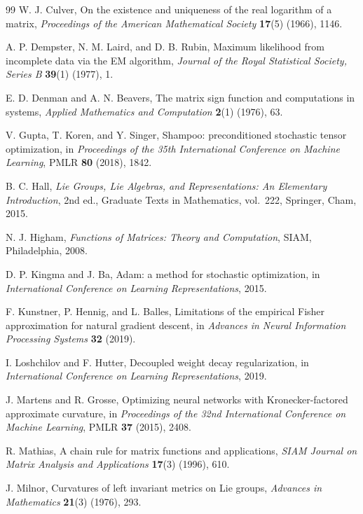\documentclass[11pt]{article}
\theoremstyle{definition}
\theoremstyle{remark}
\newcommand{\ndash}{\textendash}
\begin{document}
\begin{thebibliography}{99}
W. J. Culver, On the existence and uniqueness of the real logarithm of a matrix, \emph{Proceedings of the American Mathematical Society} \textbf{17}(5) (1966), 1146\ndash 1151.

A. P. Dempster, N. M. Laird, and D. B. Rubin, Maximum likelihood from incomplete data via the EM algorithm, \emph{Journal of the Royal Statistical Society, Series B} \textbf{39}(1) (1977), 1\ndash 38.

E. D. Denman and A. N. Beavers, The matrix sign function and computations in systems, \emph{Applied Mathematics and Computation} \textbf{2}(1) (1976), 63\ndash 94.

V. Gupta, T. Koren, and Y. Singer, Shampoo: preconditioned stochastic tensor optimization, in \emph{Proceedings of the 35th International Conference on Machine Learning}, PMLR \textbf{80} (2018), 1842\ndash 1850.

B. C. Hall, \emph{Lie Groups, Lie Algebras, and Representations: An Elementary Introduction}, 2nd ed., Graduate Texts in Mathematics, vol.~222, Springer, Cham, 2015.

N. J. Higham, \emph{Functions of Matrices: Theory and Computation}, SIAM, Philadelphia, 2008.

D. P. Kingma and J. Ba, Adam: a method for stochastic optimization, in \emph{International Conference on Learning Representations}, 2015.

F. Kunstner, P. Hennig, and L. Balles, Limitations of the empirical Fisher approximation for natural gradient descent, in \emph{Advances in Neural Information Processing Systems} \textbf{32} (2019).

I. Loshchilov and F. Hutter, Decoupled weight decay regularization, in \emph{International Conference on Learning Representations}, 2019.

J. Martens and R. Grosse, Optimizing neural networks with Kronecker-factored approximate curvature, in \emph{Proceedings of the 32nd International Conference on Machine Learning}, PMLR \textbf{37} (2015), 2408\ndash 2417.

R. Mathias, A chain rule for matrix functions and applications, \emph{SIAM Journal on Matrix Analysis and Applications} \textbf{17}(3) (1996), 610\ndash 620.

J. Milnor, Curvatures of left invariant metrics on Lie groups, \emph{Advances in Mathematics} \textbf{21}(3) (1976), 293\ndash 329.


\end{thebibliography}
\end{document}
